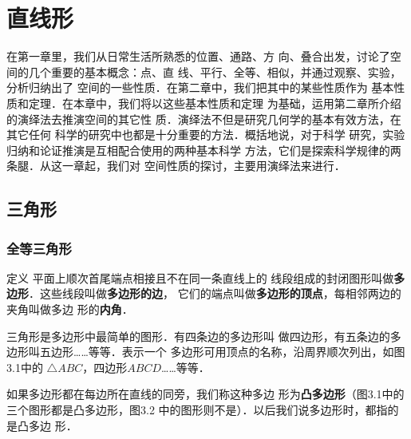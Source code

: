 \chapter{直线形}

在第一章里，我们从日常生活所熟悉的位置、通路、方
向、叠合出发，讨论了空间的几个重要的基本概念：点、直
线、平行、全等、相似，并通过观察、实验，分析归纳出了
空间的一些性质．在第二章中，我们把其中的某些性质作为
基本性质和定理．在本章中，我们将以这些基本性质和定理
为基础，运用第二章所介绍的演绎法去推演空间的其它性
质．演绎法不但是研究几何学的基本有效方法，在其它任何
科学的研究中也都是十分重要的方法．概括地说，对于科学
研究，实验归纳和论证推演是互相配合使用的两种基本科学
方法，它们是探索科学规律的两条腿．从这一章起，我们对
空间性质的探讨，主要用演绎法来进行．
\section{三角形}

\subsection{全等三角形}

\begin{blk}{定义}
    平面上顺次首尾端点相接且不在同一条直线上的
线段组成的封闭图形叫做\textbf{多边形}．这些线段叫做\textbf{多边形的边}，
它们的端点叫做\textbf{多边形的顶点}，每相邻两边的夹角叫做多边
形的\textbf{内角}．
\end{blk}


三角形是多边形中最简单的图形．有四条边的多边形叫
做四边形，有五条边的多边形叫五边形……等等．表示一个
多边形可用顶点的名称，沿周界顺次列出，如图3.1中的
$\triangle ABC$，四边形$ABCD$……等等．

如果多边形都在每边所在直线的同旁，我们称这种多边
形为\textbf{凸多边形}（图3.1中的三个图形都是凸多边形，图3.2
中的图形则不是）．以后我们说多边形时，都指的是凸多边
形．
\begin{figure}[htp]
    \centering
    \caption{}
\end{figure}

